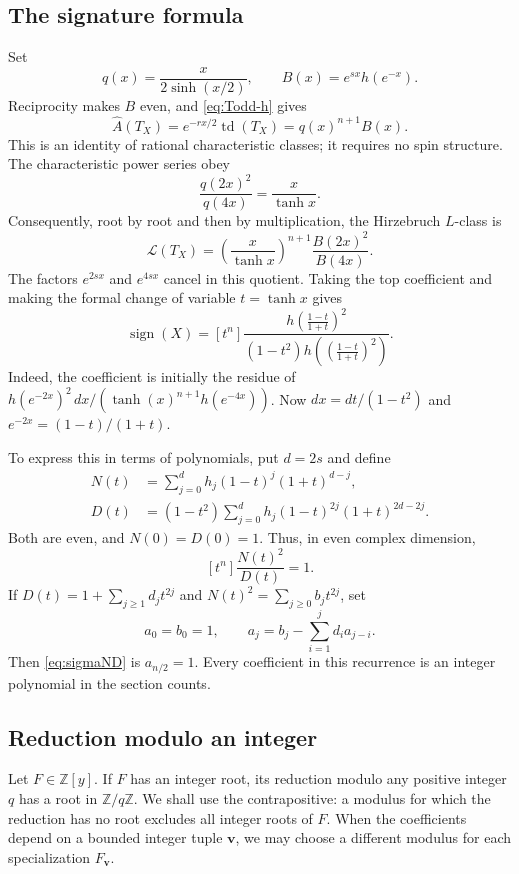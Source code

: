\documentclass[11pt,reqno,letterpaper]{amsart}
\newcommand{\Z}{\mathbb Z}
\newcommand{\td}{\operatorname{td}}
\newcommand{\sgn}{\operatorname{sign}}
\newcommand{\Ahat}{\widehat A}
\theoremstyle{definition}
\numberwithin{equation}{section}
\begin{document}
\subsection{The signature formula}
Set
\[
 q(x)=\frac{x}{2\sinh(x/2)},\qquad B(x)=e^{sx}h(e^{-x}).
\]
Reciprocity makes $B$ even, and \eqref{eq:Todd-h} gives
\[
 \Ahat(T_X)=e^{-rx/2}\td(T_X)=q(x)^{n+1}B(x).
\]
This is an identity of rational characteristic classes; it requires no
spin structure. The characteristic power series obey
\[
 \frac{q(2x)^2}{q(4x)}=\frac{x}{\tanh x}.
\]
Consequently, root by root and then by multiplication, the Hirzebruch
$L$-class is
\[
 \mathcal L(T_X)=\left(\frac{x}{\tanh x}\right)^{n+1}
                 \frac{B(2x)^2}{B(4x)}.
\]
The factors $e^{2sx}$ and $e^{4sx}$ cancel in this quotient. Taking the
top coefficient and making the formal change of variable $t=\tanh x$
gives
\begin{equation}\label{eq:signature-h}
 \sgn(X)=[t^n]\frac{
 h\!\left(\frac{1-t}{1+t}\right)^2}{
 (1-t^2)h\!\left(\left(\frac{1-t}{1+t}\right)^2\right)}.
\end{equation}
Indeed, the coefficient is initially the residue of
$h(e^{-2x})^2\,dx/(\tanh(x)^{n+1}h(e^{-4x}))$.
Now $dx=dt/(1-t^2)$ and $e^{-2x}=(1-t)/(1+t)$.

To express this in terms of polynomials, put $d=2s$ and define
\begin{align}
 N(t)&=\sum_{j=0}^d h_j(1-t)^j(1+t)^{d-j},\label{eq:ND}\\
 D(t)&=(1-t^2)\sum_{j=0}^d h_j(1-t)^{2j}(1+t)^{2d-2j}.\nonumber
\end{align}
Both are even, and $N(0)=D(0)=1$. Thus, in even complex dimension,
\begin{equation}\label{eq:sigmaND}
 [t^n]\frac{N(t)^2}{D(t)}=1.
\end{equation}
If $D(t)=1+\sum_{j\ge1}d_jt^{2j}$ and
$N(t)^2=\sum_{j\ge0}b_jt^{2j}$, set
\begin{equation}\label{eq:division}
 a_0=b_0=1,\qquad a_j=b_j-\sum_{i=1}^j d_i a_{j-i}.
\end{equation}
Then \eqref{eq:sigmaND} is $a_{n/2}=1$. Every coefficient in this recurrence
is an integer polynomial in the section counts.

\subsection{Reduction modulo an integer}
Let $F\in\Z[y]$. If $F$ has an integer root, its reduction modulo
any positive integer $q$ has a root in $\Z/q\Z$. We shall use the
contrapositive: a modulus for which the reduction has no root excludes
all integer roots of $F$. When the coefficients depend on a bounded
integer tuple $\boldsymbol v$, we may choose a different modulus for
each specialization $F_{\boldsymbol v}$.
\end{document}
